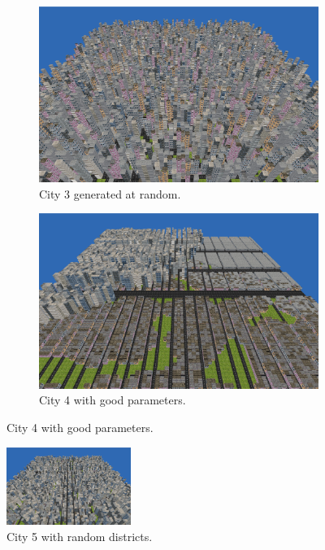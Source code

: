 \begin{figure}[h]
	\centering
	\begin{subfigure}{0.4\textwidth}
		\centering
		\includegraphics[width=0.9\linewidth]{"Images/full random"}
		\caption*{City 3 generated at random.}
		\label{fig:full-random}
	\end{subfigure}
	\begin{subfigure}{0.4\textwidth}
		\centering
		\includegraphics[width=0.9\linewidth]{"Images/good parameters 03"}
		\caption*{City 4 with good parameters.}
		\label{fig:good-parameters-03}
	\end{subfigure}
	\label{fig:city34}
\end{figure}

\begin{figure}[h]
	\centering
	\includegraphics[width=0.36\textwidth]{"Images/random districts"}
	\caption*{City 5 with random districts.}
	\label{fig:random-districts}
\end{figure}
	
